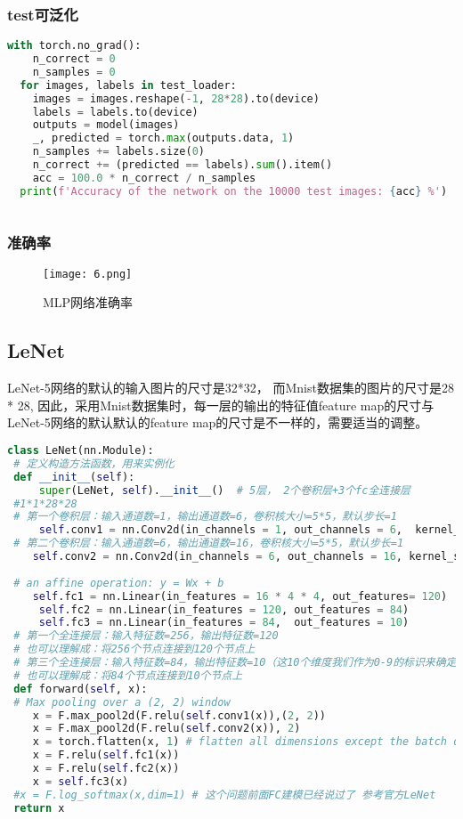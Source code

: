 \subsubsection{test可泛化}
 \begin{lstlisting}[language=python]
  with torch.no_grad():
  	n_correct = 0
  	n_samples = 0
  for images, labels in test_loader:
  	images = images.reshape(-1, 28*28).to(device)
  	labels = labels.to(device)
  	outputs = model(images) 
  	_, predicted = torch.max(outputs.data, 1)
  	n_samples += labels.size(0)
  	n_correct += (predicted == labels).sum().item()
  	acc = 100.0 * n_correct / n_samples
  print(f'Accuracy of the network on the 10000 test images: {acc} %')
  
\end{lstlisting}
\subsubsection{准确率}

	\begin{figure}[!h]
	\centering
	\texttt{[image: 6.png]}
	\caption{MLP网络准确率}
	\label{fig:circuitm1}
\end{figure} \par
\subsection{LeNet}
LeNet-5网络的默认的输入图片的尺寸是32*32， 而Mnist数据集的图片的尺寸是28 * 28,
因此，采用Mnist数据集时，每一层的输出的特征值feature map的尺寸与LeNet-5网络的默认默认的feature map的尺寸是不一样的，需要适当的调整。
\begin{lstlisting}[language=python]
 class LeNet(nn.Module):
 # 定义构造方法函数，用来实例化
 def __init__(self):
	 super(LeNet, self).__init__()  # 5层， 2个卷积层+3个fc全连接层
 #1*1*28*28
 # 第一个卷积层：输入通道数=1，输出通道数=6，卷积核大小=5*5，默认步长=1
	 self.conv1 = nn.Conv2d(in_channels = 1, out_channels = 6,  kernel_size = 5)   # 6 * 24 * 24 
 # 第二个卷积层：输入通道数=6，输出通道数=16，卷积核大小=5*5，默认步长=1
 	self.conv2 = nn.Conv2d(in_channels = 6, out_channels = 16, kernel_size = 5)   # 16 * 8 * 8
 
 # an affine operation: y = Wx + b
 	self.fc1 = nn.Linear(in_features = 16 * 4 * 4, out_features= 120)             # 16 * 4 * 4
	 self.fc2 = nn.Linear(in_features = 120, out_features = 84)
	 self.fc3 = nn.Linear(in_features = 84,  out_features = 10)
 # 第一个全连接层：输入特征数=256，输出特征数=120
 # 也可以理解成：将256个节点连接到120个节点上
 # 第三个全连接层：输入特征数=84，输出特征数=10（这10个维度我们作为0-9的标识来确定识别出的是那个数字。）
 # 也可以理解成：将84个节点连接到10个节点上
 def forward(self, x):
 # Max pooling over a (2, 2) window
 	x = F.max_pool2d(F.relu(self.conv1(x)),(2, 2))
	x = F.max_pool2d(F.relu(self.conv2(x)), 2)
 	x = torch.flatten(x, 1) # flatten all dimensions except the batch dimension
	x = F.relu(self.fc1(x))
 	x = F.relu(self.fc2(x))
 	x = self.fc3(x)
 #x = F.log_softmax(x,dim=1) # 这个问题前面FC建模已经说过了 参考官方LeNet
 return x
\end{lstlisting}

